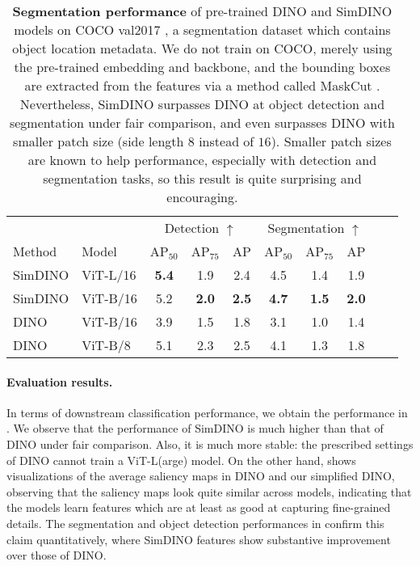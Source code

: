\documentclass[../../book-main.tex]{subfiles}
\begin{document}
\begin{table}
    \centering 
    \begin{tabular}{@{}llcccccccc@{}}
        \toprule
         &  & \multicolumn{3}{c}{Detection $\uparrow$} &  \multicolumn{3}{c}{Segmentation $\uparrow$} \\ 
        Method & Model & AP$_{50}$  & AP$_{75}$ & AP & AP$_{50}$ & AP$_{75}$ & AP  \\ 
        \midrule
        SimDINO &ViT-L/16 &\bf 5.4 &1.9 &2.4 &4.5 &1.4 &1.9 \\
        SimDINO &ViT-B/16 &5.2 & \bf 2.0 & \bf 2.5 & \bf4.7 & \bf 1.5 & \bf 2.0 \\
        DINO &ViT-B/16 &3.9 &1.5 &1.8 &3.1 &1.0 &1.4 \\
        \midrule
        \color{gray} DINO & \color{gray} ViT-B/8 & \color{gray}5.1 & \color{gray}2.3 & \color{gray}2.5 & \color{gray}4.1 & \color{gray}1.3 & \color{gray}1.8 \\
        \bottomrule
    \end{tabular}
    \caption{\small\textbf{Segmentation performance} of pre-trained DINO and SimDINO models on COCO val2017 \citep{lin2014microsoft}, a segmentation dataset which contains object location metadata. We do not train on COCO, merely using the pre-trained embedding and backbone, and the bounding boxes are extracted from the features via a method called MaskCut \citep{wang2023cut}. Nevertheless, SimDINO surpasses DINO at object detection and segmentation under fair comparison, and even surpasses DINO with smaller patch size (side length \(8\) instead of \(16\)). Smaller patch sizes are known to help performance, especially with detection and segmentation tasks, so this result is quite surprising and encouraging.}
    \label{tab:dino_segmentation}
\end{table}

\paragraph{Evaluation results.} In terms of downstream classification performance, we obtain the performance in . We observe that the performance of SimDINO is much higher than that of DINO under fair comparison. Also, it is much more stable: the prescribed settings of DINO cannot train a ViT-L(arge) model. On the other hand,  shows visualizations of the average saliency maps in DINO and our simplified DINO, observing that the saliency maps look quite similar across models, indicating that the models learn features which are at least as good at capturing fine-grained details. The segmentation and object detection performances in  confirm this claim quantitatively, where SimDINO features show substantive improvement over those of DINO.
\end{document}
